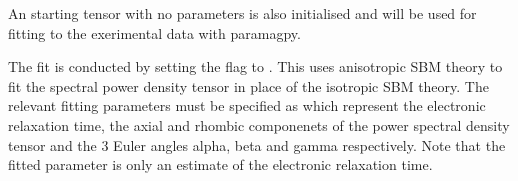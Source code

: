 \documentclass[a4paper,10pt,english,openany,oneside]{sphinxmanual}
\begin{document}
%
\begin{sphinxVerbatim}[commandchars=\\\{\}]
    

  \PYG{p}{[}
	\PYG{p}{[}  \PYG{p}{]}
	\PYG{p}{[}  \PYG{p}{]}
	\PYG{p}{[}  \PYG{p}{]}\PYG{p}{]}  
\end{sphinxVerbatim}

An starting tensor with no parameters is also initialised and will be used for fitting to the exerimental data with paramagpy.

%
\begin{sphinxVerbatim}[commandchars=\\\{\}]
    
\end{sphinxVerbatim}

The fit is conducted by setting the  flag to . This uses anisotropic SBM theory to fit the spectral power density tensor in place of the isotropic SBM theory. The relevant fitting parameters must be specified as  which represent the electronic relaxation time, the axial and rhombic componenets of the power spectral density tensor and the 3 Euler angles alpha, beta and gamma respectively. Note that the fitted  parameter is only an estimate of the electronic relaxation time.
\end{document}
